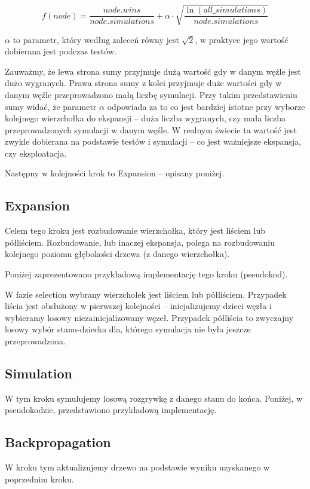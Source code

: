 \documentclass[polish,shortabstract,inz]{iithesis}
\begin{document}
\[ f\left(node\right) = \frac{node.wins}{node.simulations} + \alpha \cdot \sqrt{\frac{\ln{\left(all\_simulations\right)}}{node.simulations}} \]

\( \alpha \) to parametr, który według zaleceń równy jest \( \sqrt{2} \), w praktyce jego wartość dobierana jest podczas testów.

Zauważmy, że lewa strona sumy przyjmuje dużą wartość gdy w danym węźle jest dużo wygranych.
Prawa strona sumy z kolei przyjmuje duże wartości gdy w danym węźle przeprowadzono małą liczbę symulacji.
Przy takim przedstawieniu sumy widać, że parametr \( \alpha \) odpowiada za to co jest bardziej istotne przy wyborze kolejnego wierzchołka do ekspansji -- duża liczba wygranych, czy mała liczba przeprowadzonych symulacji w danym węźle.
W realnym świecie ta wartość jest zwykle dobierana na podstawie testów i symulacji -- co jest ważniejsze ekspansja, czy eksploatacja.

Następny w kolejności krok to Expansion -- opisany poniżej.

\subsection{Expansion}
Celem tego kroku jest rozbudowanie wierzchołka, który jest liściem lub półliściem.
Rozbudowanie, lub inaczej ekspansja, polega na rozbudowaniu kolejnego poziomu głębokości drzewa (z danego wierzchołka).

Poniżej zaprezentowano przykładową implementację tego kroku (pseudokod).



W fazie selection wybrany wierzchołek jest liściem lub półliściem.
Przypadek liścia jest obsłużony w pierwszej kolejności -- inicjalizujemy dzieci węzła i wybieramy losowy niezainicjalizowany węzeł.
Przypadek półliścia to zwyczajny losowy wybór stanu-dziecka dla, którego symulacja nie była jeszcze przeprowadzona.

\subsection{Simulation}
W tym kroku symulujemy losową rozgrywkę z danego stanu do końca.
Poniżej, w pseudokodzie, przedstawiono przykładową implementację.



\subsection{Backpropagation}
W kroku tym aktualizujemy drzewo na podstawie wyniku uzyskanego w poprzednim kroku.
\end{document}
